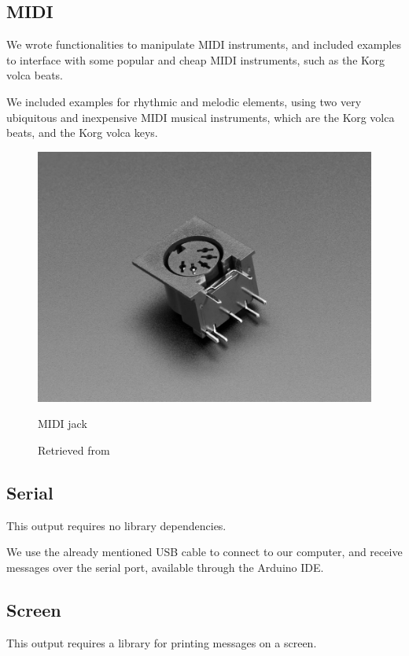 \subsection{MIDI}

We wrote functionalities to manipulate \acrshort{MIDI} instruments, and included examples to interface with some popular and cheap \acrshort{MIDI} instruments, such as the Korg volca beats.

We included examples for rhythmic and melodic elements, using two very ubiquitous and inexpensive \acrshort{MIDI} musical instruments, which are the Korg volca beats, and the Korg volca keys.

\begin{figure}[ht]
  \centering
  \includegraphics[width=0.75\linewidth,height=0.25\textheight,keepaspectratio]{images/materials-adafruit-midi-jack.jpg}
  \caption{MIDI jack}
  \caption*{Retrieved from \cite{website-materials-adafruit-midi-jack}}
  \label{fig:materials-adafruit-midi-jack}
\end{figure}

\subsection{Serial}

This output requires no library dependencies.

We use the already mentioned USB cable to connect to our computer, and receive messages over the serial port, available through the Arduino IDE.

\subsection{Screen}

This output requires a library for printing messages on a screen.

